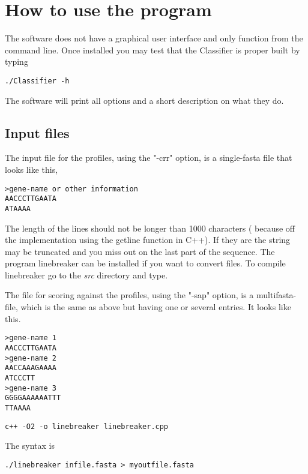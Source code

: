 \documentclass[]{article}
\begin{document}
\section{How to use the program}
The software does not have a graphical user interface and only function
from the command line. Once installed you may test that the Classifier
is proper built by typing
\begin{verbatim}
./Classifier -h
\end{verbatim}
The software will print all options and a short description on what they
do.
\subsection{Input files}
The input file for the profiles, using the "-crr" option, is a single-fasta file that looks like this,
\begin{verbatim}
>gene-name or other information
AACCCTTGAATA
ATAAAA
\end{verbatim}
The length of the lines should not be longer than 1000 characters (
because off the implementation using the getline function in C++). If they are the string may be truncated and you miss out on the last part of the
sequence. The program linebreaker can be installed if you want to convert
files. To compile linebreaker go to the \textit{src} directory and type. 

The file for scoring against the profiles, using the "-sap" option, is a
multifasta-file, which is the same as above but having one or several
entries. It looks like this.
\begin{verbatim}
>gene-name 1
AACCCTTGAATA
>gene-name 2
AACCAAAGAAAA
ATCCCTT
>gene-name 3
GGGGAAAAAATTT
TTAAAA
\end{verbatim}


\begin{verbatim}
c++ -O2 -o linebreaker linebreaker.cpp
\end{verbatim}
The syntax is 
\begin{verbatim}
./linebreaker infile.fasta > myoutfile.fasta
\end{verbatim}
\end{document}
